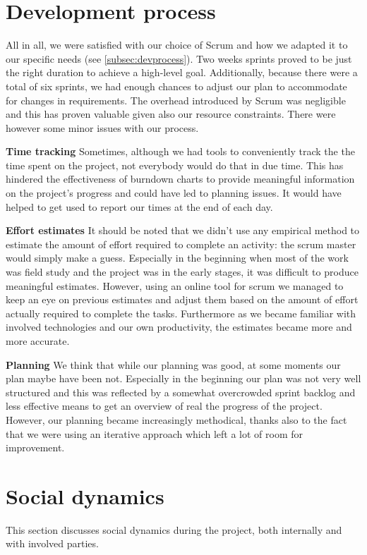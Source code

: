 \section{Development process}
All in all, we were satisfied with our choice of Scrum and how we adapted
it to our specific needs (see \ref{subsec:devprocess}).
Two weeks sprints proved to be just the right duration to achieve
a high-level goal. Additionally, because there were a total of six sprints,
we had enough chances to adjust our plan to accommodate for changes in requirements.
The overhead introduced by Scrum was negligible and this has proven valuable
given also our resource constraints. There were however some minor issues with our process.

\textbf{Time tracking}\newline
Sometimes, although we had tools to conveniently track the the time spent on the project,
not everybody would do that in due time. This has hindered the effectiveness of burndown charts
to provide meaningful information on the project's progress and could have led to planning issues.
It would have helped to get used to report our times at the end of each day.

\textbf{Effort estimates}\newline
It should be noted that we didn't use any empirical method to estimate the amount of effort
required to complete an activity: the scrum master would simply make a guess.
Especially in the beginning when most of the work was field study and the project
was in the early stages, it was difficult to produce meaningful estimates.
However, using an online tool for scrum we managed to keep an eye on previous
estimates and adjust them based on the amount of effort actually required to complete the tasks.
Furthermore as we became familiar with involved technologies and our own productivity,
the estimates became more and more accurate.

\textbf{Planning}\newline
We think that while our planning was good, at some moments our plan maybe have been not.
Especially in the beginning our plan was not very well structured and this was reflected
by a somewhat overcrowded sprint backlog and less effective means to get an overview
of real the progress of the project. However, our planning became increasingly
methodical, thanks also to the fact that we were using an iterative approach which
left a lot of room for improvement.%

\section{Social dynamics}
This section discusses social dynamics during the project, both internally and with
involved parties.

